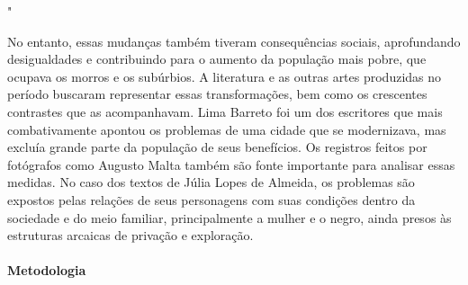 \documentclass[12pt]{extarticle}
\begin{document}




"


No entanto, essas mudanças também tiveram consequências sociais,
aprofundando desigualdades e contribuindo para o aumento da população
mais pobre, que ocupava os morros e os subúrbios. A literatura e as
outras artes produzidas no período buscaram representar essas
transformações, bem como os crescentes contrastes que as
acompanhavam. Lima Barreto foi um dos escritores que mais combativamente
apontou os problemas de uma cidade que se modernizava, mas excluía
grande parte da população de seus benefícios. Os registros feitos por
fotógrafos como Augusto Malta também são fonte importante para analisar
essas medidas. No caso dos textos de Júlia Lopes de Almeida, os
problemas são expostos pelas relações de seus personagens com suas
condições dentro da sociedade e do meio familiar, principalmente a
mulher e o negro, ainda presos às estruturas arcaicas de privação e
exploração.

\paragraph{Metodologia} 
\end{document}
